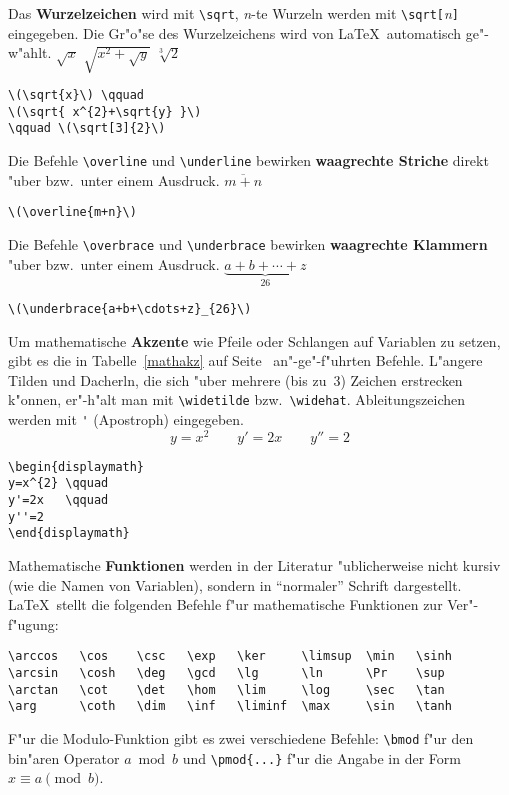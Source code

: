 Das \textbf{Wurzelzeichen} wird mit \verb|\sqrt|, \textit{n}-te
Wurzeln werden mit \verb|\sqrt[|\textit{n}\verb|]| eingegeben.
Die Gr"o"se des Wurzelzeichens wird von \LaTeX\ automatisch
ge"-w"ahlt.
\exa
\(\sqrt{x}\) \qquad
\(\sqrt{ x^{2}+\sqrt{y} }\)
\qquad \(\sqrt[3]{2}\)
\exb
\begin{verbatim}
\(\sqrt{x}\) \qquad
\(\sqrt{ x^{2}+\sqrt{y} }\)
\qquad \(\sqrt[3]{2}\)
\end{verbatim}
\exc
 
Die Befehle \verb|\overline| und \verb|\underline| bewirken
\textbf{waagrechte Striche} direkt "uber bzw.\ unter einem
Ausdruck.
\exa
\(\overline{m+n}\)
\exb
\begin{verbatim}
\(\overline{m+n}\)
\end{verbatim}
\exc
 
Die Befehle \verb|\overbrace| und \verb|\underbrace| bewirken
\textbf{waagrechte Klammern} "uber bzw.\ unter einem Ausdruck.
\exa
\(\underbrace{a+b+\cdots+z}_{26}\)
\exb
\begin{verbatim}
\(\underbrace{a+b+\cdots+z}_{26}\)
\end{verbatim}
\exc
 
Um mathematische \textbf{Akzente} wie Pfeile oder Schlangen auf
Variablen zu setzen, gibt es die in Tabelle~\ref{mathakz} auf
Seite~\pageref{mathakz} an"-ge"-f"uhrten Befehle.
L"angere Tilden und Dacherln, die sich "uber mehrere (bis zu~3)
Zeichen erstrecken k"onnen, er"-h"alt man mit \verb|\widetilde|
bzw.\ \verb|\widehat|.
Ableitungszeichen werden mit \verb|'| (Apostroph) eingegeben.
\exa
\begin{displaymath}
y=x^{2} \qquad
y'=2x   \qquad
y''=2
\end{displaymath}
\exb
\begin{verbatim}
\begin{displaymath}
y=x^{2} \qquad
y'=2x   \qquad
y''=2
\end{displaymath}
\end{verbatim}
\exc
 
Mathematische \textbf{Funktionen} werden in der Literatur
"ublicherweise nicht kursiv (wie die Namen von Variablen),
sondern in "`normaler"' Schrift dargestellt.
\LaTeX\ stellt die folgenden Befehle f"ur mathematische
Funktionen zur Ver"-f"ugung:
\begin{verbatim}
\arccos   \cos    \csc   \exp   \ker     \limsup  \min   \sinh
\arcsin   \cosh   \deg   \gcd   \lg      \ln      \Pr    \sup
\arctan   \cot    \det   \hom   \lim     \log     \sec   \tan
\arg      \coth   \dim   \inf   \liminf  \max     \sin   \tanh
\end{verbatim}
F"ur die Modulo-Funktion gibt es zwei verschiedene Befehle:
\verb|\bmod| f"ur den bin"aren Operator \(a \bmod b\) und
\verb|\pmod{...}| f"ur die Angabe in der Form \(x\equiv a
\pmod{b}\).
 
